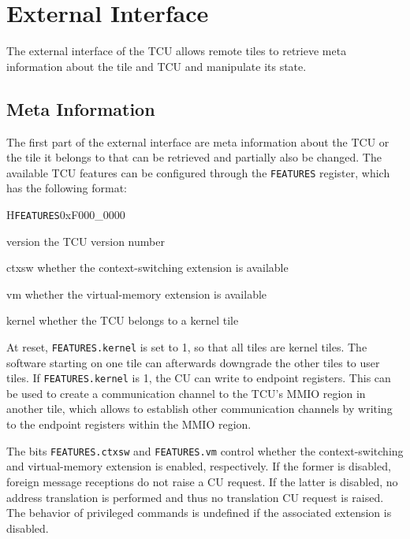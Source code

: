 \chapter{External Interface}

The external interface of the TCU allows remote tiles to retrieve meta information about the tile
and TCU and manipulate its state.

\section{Meta Information}

The first part of the external interface are meta information about the TCU or the tile it belongs
to that can be retrieved and partially also be changed. The available TCU features can be configured
through the \texttt{FEATURES} register, which has the following format:

\setlength{\regWidth}{.95\textwidth}
\begin{register}{H}{\texttt{FEATURES}}{0xF000\_0000}
  \regnewline%
  \begin{regdesc}\begin{reglist}
    \item[version] the TCU version number
    \item[ctxsw] whether the context-switching extension is available
    \item[vm] whether the virtual-memory extension is available
    \item[kernel] whether the TCU belongs to a kernel tile
  \end{reglist}\end{regdesc}
\end{register}
\setlength{\regWidth}{\textwidth}

\noindent At reset, \texttt{FEATURES.kernel} is set to 1, so that all tiles are kernel tiles. The
software starting on one tile can afterwards downgrade the other tiles to user tiles. If
\texttt{FEATURES.kernel} is 1, the CU can write to endpoint registers. This can be used to create a
communication channel to the TCU's MMIO region in another tile, which allows to establish other
communication channels by writing to the endpoint registers within the MMIO region.

The bits \texttt{FEATURES.ctxsw} and \texttt{FEATURES.vm} control whether the context-switching and
virtual-memory extension is enabled, respectively. If the former is disabled, foreign message
receptions do not raise a CU request. If the latter is disabled, no address translation is
performed and thus no translation CU request is raised. The behavior of privileged commands is
undefined if the associated extension is disabled.

